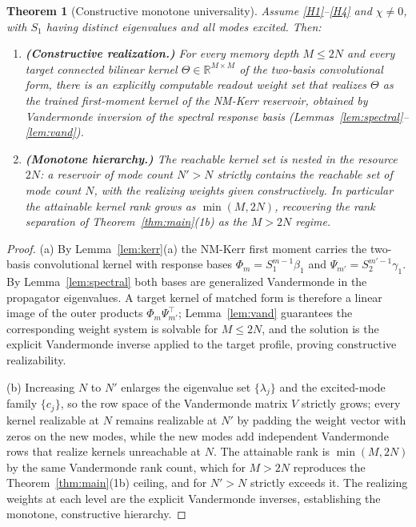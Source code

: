 \documentclass[11pt]{article}
\newtheorem{theorem}{Theorem}
\theoremstyle{remark}
\begin{document}
\begin{theorem}[Constructive monotone universality]\label{thm:univ}
Assume \ref{H1}--\ref{H4} and $\chi\neq0$, with $S_1$ having distinct eigenvalues
and all modes excited. Then:
\begin{enumerate}[label=(\alph*)]
\item \textbf{(Constructive realization.)} For every memory depth $M\le2N$ and
every target connected bilinear kernel $\Theta\in\mathbb{R}^{M\times M}$ of the
two-basis convolutional form, there is an explicitly computable readout weight set
that realizes $\Theta$ as the trained first-moment kernel of the NM-Kerr
reservoir, obtained by Vandermonde inversion of the spectral response basis
(Lemmas~\ref{lem:spectral}--\ref{lem:vand}).
\item \textbf{(Monotone hierarchy.)} The reachable kernel set is nested in the
resource $2N$: a reservoir of mode count $N'>N$ strictly contains the reachable
set of mode count $N$, with the realizing weights given constructively. In
particular the attainable kernel rank grows as $\min(M,2N)$, recovering the
rank separation of Theorem~\ref{thm:main}(1b) as the $M>2N$ regime.
\end{enumerate}
\end{theorem}

\begin{proof}
(a) By Lemma~\ref{lem:kerr}(a) the NM-Kerr first moment carries the two-basis
convolutional kernel with response bases $\Phi_m=S_1^{m-1}\beta_1$ and
$\Psi_{m'}=S_2^{m'-1}\gamma_1$. By Lemma~\ref{lem:spectral} both bases are
generalized Vandermonde in the propagator eigenvalues. A target kernel of matched
form is therefore a linear image of the outer products
$\Phi_m\Psi_{m'}^\top$; Lemma~\ref{lem:vand} guarantees the corresponding weight
system is solvable for $M\le2N$, and the solution is the explicit Vandermonde
inverse applied to the target profile, proving constructive realizability.

(b) Increasing $N$ to $N'$ enlarges the eigenvalue set $\{\lambda_j\}$ and the
excited-mode family $\{c_j\}$, so the row space of the Vandermonde matrix
$V$ strictly grows; every kernel realizable at $N$ remains realizable at $N'$ by
padding the weight vector with zeros on the new modes, while the new modes add
independent Vandermonde rows that realize kernels unreachable at $N$. The
attainable rank is $\min(M,2N)$ by the same Vandermonde rank count, which for
$M>2N$ reproduces the Theorem~\ref{thm:main}(1b) ceiling, and for $N'>N$ strictly
exceeds it. The realizing weights at each level are the explicit Vandermonde
inverses, establishing the monotone, constructive hierarchy.
\end{proof}
\end{document}
